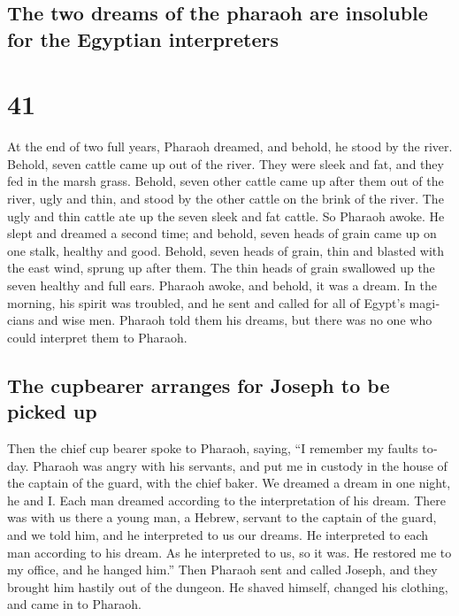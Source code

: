 \begin{paracol}{2}
\switchcolumn
\begin{otherlanguage}{english}

\hypertarget{the-two-dreams-of-the-pharaoh-are-insoluble-for-the-egyptian-interpreters}{%
\subsection{The two dreams of the pharaoh are insoluble for the Egyptian
interpreters}\label{the-two-dreams-of-the-pharaoh-are-insoluble-for-the-egyptian-interpreters}}

\hypertarget{section-81}{%
\section{41}\label{section-81}}

 At the end of two full years, Pharaoh dreamed, and
behold, he stood by the river.  Behold, seven cattle came
up out of the river. They were sleek and fat, and they fed in the marsh
grass.  Behold, seven other cattle came up after them out
of the river, ugly and thin, and stood by the other cattle on the brink
of the river.  The ugly and thin cattle ate up the seven
sleek and fat cattle. So Pharaoh awoke.  He slept and
dreamed a second time; and behold, seven heads of grain came up on one
stalk, healthy and good.  Behold, seven heads of grain,
thin and blasted with the east wind, sprung up after them.
 The thin heads of grain swallowed up the seven healthy
and full ears. Pharaoh awoke, and behold, it was a dream. 
In the morning, his spirit was troubled, and he sent and called for all
of Egypt's magicians and wise men. Pharaoh told them his dreams, but
there was no one who could interpret them to Pharaoh.

\hypertarget{the-cupbearer-arranges-for-joseph-to-be-picked-up}{%
\subsection{The cupbearer arranges for Joseph to be picked
up}\label{the-cupbearer-arranges-for-joseph-to-be-picked-up}}

 Then the chief cup bearer spoke to Pharaoh, saying, ``I
remember my faults today.  Pharaoh was angry with his
servants, and put me in custody in the house of the captain of the
guard, with the chief baker.  We dreamed a dream in one
night, he and I. Each man dreamed according to the interpretation of his
dream.  There was with us there a young man, a Hebrew,
servant to the captain of the guard, and we told him, and he interpreted
to us our dreams. He interpreted to each man according to his dream.
 As he interpreted to us, so it was. He restored me to my
office, and he hanged him.''  Then Pharaoh sent and
called Joseph, and they brought him hastily out of the dungeon. He
shaved himself, changed his clothing, and came in to Pharaoh.


\end{otherlanguage}
\end{paracol}
